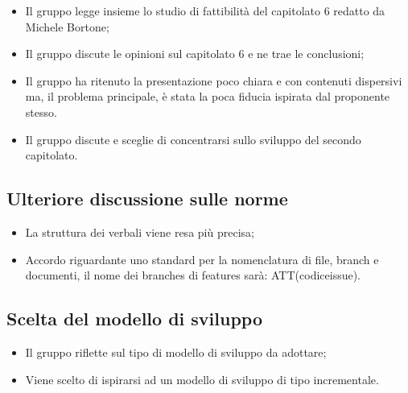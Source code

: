\documentclass[11pt,a4paper]{article}
\begin{document}
\begin{itemize}
	\item Il gruppo legge insieme lo studio di fattibilità del capitolato 6 redatto da Michele Bortone;
	\item Il gruppo discute le opinioni sul capitolato 6 e ne trae le conclusioni;
	\item Il gruppo ha ritenuto la presentazione poco chiara e con contenuti dispersivi ma, il problema principale, è stata la poca fiducia ispirata dal proponente stesso. 
	\item Il gruppo discute e sceglie di concentrarsi sullo sviluppo del secondo capitolato.
	\end{itemize}

	\subsection{Ulteriore discussione sulle norme}
	\begin{itemize}
	\item La struttura dei verbali viene resa più precisa;
	\item Accordo riguardante uno standard per la nomenclatura di file, branch e documenti, il nome dei branches di features sarà: ATT(codiceissue).
	\end{itemize}
	\subsection{Scelta del modello di sviluppo}	
	\begin{itemize}
	\item Il gruppo riflette sul tipo di modello di sviluppo da adottare;
	\item Viene scelto di ispirarsi ad un modello di sviluppo di tipo incrementale.
	\end{itemize}
\end{document}
